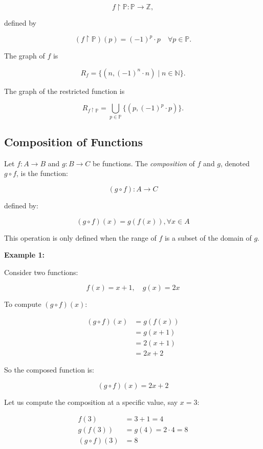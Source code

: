 \documentclass[12pt,a4paper,openany]{article}
\begin{document}
\[
f\!\restriction \mathbb{P} :\mathbb{P} \to \mathbb{Z},
\]

defined by

\[
(f\!\restriction \mathbb{P})(p) = (-1)^p \cdot p 
\quad \forall p \in \mathbb{P}.
\]

The graph of $f$ is

\[
R_f = \{ (n, (-1)^n \cdot n ) \mid n \in \mathbb{N} \}.
\]

The graph of the restricted function is

\[
R_{f\!\restriction \mathbb{P}}
= \displaystyle\bigcup_{p \in \mathbb{P}} \{ (p, (-1)^p \cdot p ) \}.
\]


\subsection{Composition of Functions}

Let $f: A \to B$ and $g: B \to C$ be functions. The \textit{composition} of $f$ and $g$, denoted $g \circ f$, is the function:

\[
(g \circ f): A \to C
\]

defined by:

\[
(g \circ f)(x) = g(f(x)), \forall x \in A
\]

This operation is only defined when the range of $f$ is a subset of the domain of $g$.

\textbf{Example 1: }

Consider two functions:

\[
f(x) = x + 1, \quad g(x) = 2x
\]

To compute $(g \circ f)(x)$:

\[
\begin{aligned}
(g \circ f)(x) &= g(f(x)) \\
&= g(x + 1) \\
&= 2(x + 1) \\
&= 2x + 2
\end{aligned}
\]

So the composed function is:

\[
(g \circ f)(x) = 2x + 2
\]

Let us compute the composition at a specific value, say $x = 3$:

\[
\begin{aligned}
f(3) &= 3 + 1 = 4 \\
g(f(3)) &= g(4) = 2 \cdot 4 = 8 \\
(g \circ f)(3) &= 8
\end{aligned}
\]
\end{document}
